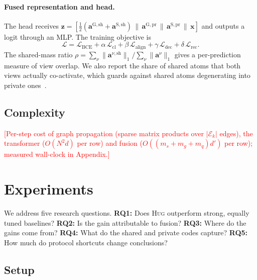 \documentclass[sigconf,anonymous,review]{acmart}
\newcommand{\tbd}[1]{\textcolor{red}{[#1]}}
\newcommand{\method}{\textsc{Hug}}      %
\newcommand{\bm}[1]{\boldsymbol{#1}}
\begin{document}
\paragraph{Fused representation and head.}
The head receives
$\bm{z} = [\tfrac{1}{2}(\bm{a}^{\mathrm{G},\mathrm{sh}} + \bm{a}^{\mathrm{S},\mathrm{sh}})
 \,\|\, \bm{a}^{\mathrm{G},\mathrm{pr}} \,\|\, \bm{a}^{\mathrm{S},\mathrm{pr}} \,\|\, \bm{x}]$
and outputs a logit through an MLP. The training objective is
\begin{equation}
  \mathcal{L} = \mathcal{L}_{\mathrm{BCE}} + \alpha\,\mathcal{L}_{\mathrm{cl}}
   + \beta\,\mathcal{L}_{\mathrm{align}} + \gamma\,\mathcal{L}_{\mathrm{dec}}
   + \delta\,\mathcal{L}_{\mathrm{rec}}.
\end{equation}
The shared-mass ratio
$\rho = \sum_{\nu}\lVert \bm{a}^{\nu,\mathrm{sh}}\rVert_1 / \sum_{\nu}\lVert \bm{a}^{\nu}\rVert_1$
gives a per-prediction measure of view overlap. We also report the share of
shared atoms that both views actually co-activate, which guards against shared
atoms degenerating into private ones~\cite{kaushik2026groupsae}.

\subsection{Complexity}
\tbd{Per-step cost of graph propagation (sparse matrix products over
$|\mathcal{E}_k|$ edges), the transformer ($O(N^2 d)$ per row) and fusion
($O((m_s + m_g + m_q) d')$ per row); measured wall-clock in Appendix.}

\section{Experiments}

We address five research questions.
\textbf{RQ1:} Does \method{} outperform strong, equally tuned baselines?
\textbf{RQ2:} Is the gain attributable to fusion?
\textbf{RQ3:} Where do the gains come from?
\textbf{RQ4:} What do the shared and private codes capture?
\textbf{RQ5:} How much do protocol shortcuts change conclusions?

\subsection{Setup}
\end{document}
